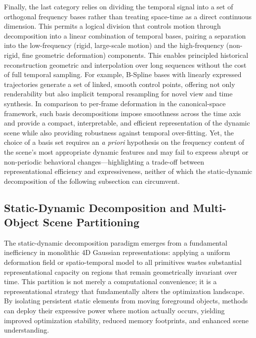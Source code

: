 \documentclass[11pt,a4paper]{article}
\begin{document}
Finally, the last category relies on dividing the temporal signal into a set of orthogonal frequency bases rather than treating space-time as a direct continuous dimension. This permits a logical division that controls motion through decomposition into a linear combination of temporal bases, pairing a separation into the low-frequency (rigid, large-scale motion) and the high-frequency (non-rigid, fine geometric deformation) components. This enables principled historical reconstruction geometric and interpolation over long sequences without the cost of full temporal sampling. For example, B-Spline bases with linearly expressed trajectories generate a set of linked, smooth control points, offering not only renderability but also implicit temporal resampling for novel view and time synthesis. In comparison to per-frame deformation in the canonical-space framework, such basis decompositions impose smoothness across the time axis and provide a compact, interpretable, and efficient representation of the dynamic scene while also providing robustness against temporal over-fitting. Yet, the choice of a basis set requires an \emph{a priori} hypothesis on the frequency content of the scene's most appropriate dynamic features and may fail to express abrupt or non-periodic behavioral changes---highlighting a trade-off between representational efficiency and expressiveness, neither of which the static-dynamic decomposition of the following subsection can circumvent.


\subsection{Static-Dynamic Decomposition and Multi-Object Scene Partitioning}


The static-dynamic decomposition paradigm emerges from a fundamental inefficiency in monolithic 4D Gaussian representations: applying a uniform deformation field or spatio-temporal model to all primitives wastes substantial representational capacity on regions that remain geometrically invariant over time. This partition is not merely a computational convenience; it is a representational strategy that fundamentally alters the optimization landscape. By isolating persistent static elements from moving foreground objects, methods can deploy their expressive power where motion actually occurs, yielding improved optimization stability, reduced memory footprints, and enhanced scene understanding.
\end{document}
